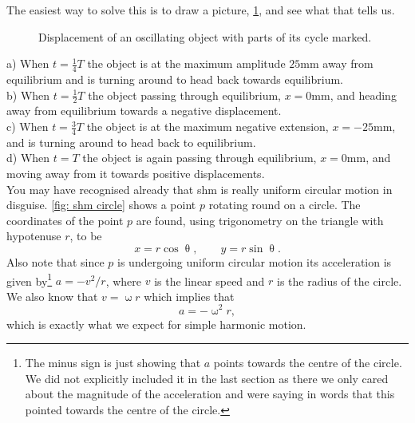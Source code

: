 \documentclass[a4paper,12pt]{book}
\begin{document}
The easiest way to solve this is to draw a picture, \cref{fig: shm with parts}, and see what that tells us. 
\begin{figure}[ht]
    \centering
    \caption{Displacement of an oscillating object with parts of its cycle marked. }
        \label{fig: shm with parts}
\end{figure}

a) When $t=\frac{1}{4}T$ the object is at the maximum amplitude $25\text{mm}$ away from equilibrium and is turning around to head back towards equilibrium.\\

b) When $t=\frac{1}{2}T$ the object passing through equilibrium, $x=0\text{mm}$, and heading away from equilibrium towards a negative displacement. \\

c) When $t=\frac{3}{4}T$ the object is at the maximum negative extension, $x=-25\text{mm}$, and is turning around to head back to equilibrium.\\

d) When $t=T$ the object is again passing through equilibrium, $x=0\text{mm}$, and moving away from it towards positive displacements.\\

You may have recognised already that shm is really uniform circular motion in disguise. \cref{fig: shm circle} shows a point $p$ rotating round on a circle. The coordinates of the point $p$ are found, using trigonometry on the triangle with hypotenuse $r$, to be
\begin{equation*}
x=r\cos\uptheta, \qquad y=r\sin\uptheta.
\end{equation*}
Also note that since $p$ is undergoing uniform circular motion its acceleration is given by\footnote{The minus sign is just showing that $a$ points towards the centre of the circle. We did not explicitly included it in the last section as there we only cared about the magnitude of the acceleration and were saying in words that this pointed towards the centre of the circle.} $a=-v^{2}/r$, where $v$ is the linear speed and $r$ is the radius of the circle. We also know that $v=\upomega r$ which implies that
\begin{equation*}
a=-\upomega^{2}r,
\end{equation*}
which is exactly what we expect for simple harmonic motion.
\end{document}
